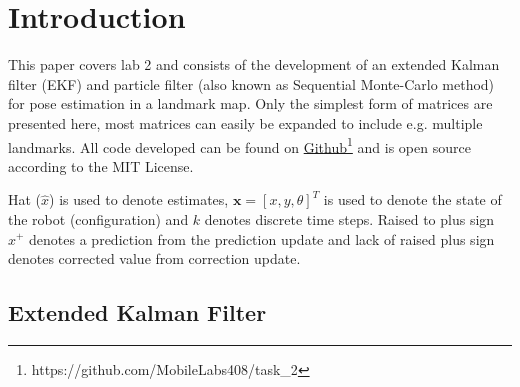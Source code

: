 \section{Introduction}

This paper covers lab 2 and consists of the development of an extended Kalman filter (EKF) and particle filter (also known as Sequential Monte-Carlo method) for pose estimation in a landmark map. 
Only the simplest form of matrices are presented here, most matrices can easily be expanded to include e.g. multiple landmarks.
All code developed can be found on \href{https://github.com/MobileLabs408/task_2}{Github}\footnote{https://github.com/MobileLabs408/task\_2} and is open source according to the MIT License.

Hat ($\hat{x}$) is used to denote estimates, $\mathbf{x} = [x,y,\theta]^T$ is used to denote the state of the robot (configuration) and $k$ denotes discrete time steps. Raised to plus sign $x^+$ denotes a prediction from the prediction update and lack of raised plus sign denotes corrected value from correction update.


\subsection{Extended Kalman Filter}

